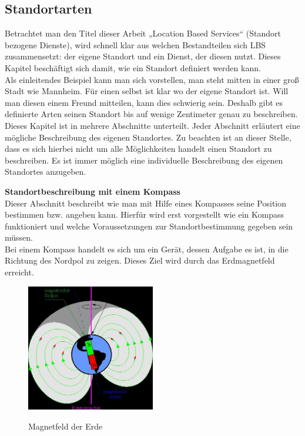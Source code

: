 \subsection{Standortarten}
Betrachtet man den Titel dieser Arbeit „Location Based Services“ (Standort bezogene Dienste), wird schnell klar aus welchen Bestandteilen sich LBS zusammensetzt: der eigene Standort und ein Dienst, der diesen nutzt. Dieses Kapitel beschäftigt sich damit, wie ein Standort definiert werden kann.
\\Als einleitendes Beispiel kann man sich vorstellen, man steht mitten in einer groß Stadt wie Mannheim. Für einen selbst ist klar wo der eigene Standort ist. Will man diesen einem Freund mitteilen, kann dies schwierig sein. Deshalb gibt es definierte Arten seinen Standort bis auf wenige Zentimeter genau zu beschreiben. Dieses Kapitel ist in mehrere Abschnitte unterteilt. Jeder Abschnitt erläutert eine mögliche Beschreibung des eigenen Standortes.
Zu beachten ist an dieser Stelle, dass es sich hierbei nicht um alle Möglichkeiten handelt einen Standort zu beschreiben. Es ist immer möglich eine individuelle Beschreibung des eigenen Standortes anzugeben. 

\textbf{Standortbeschreibung mit einem Kompass}
\\Dieser Abschnitt beschreibt wie man mit Hilfe eines Kompasses seine Position bestimmen bzw. angeben kann. Hierfür wird erst vorgestellt wie ein Kompass funktioniert und welche Voraussetzungen zur Standortbestimmung gegeben sein müssen.
\\Bei einem Kompass handelt es sich um ein Gerät, dessen Aufgabe es ist, in die Richtung des Nordpol zu zeigen. Dieses Ziel wird durch das Erdmagnetfeld erreicht.


\begin{figure}
  \centering
    \includegraphics[width=0.50\textwidth]{ref/images/magnetfeld.jpg}
   \caption{Magnetfeld der Erde}
  \label{fig:Magnetfeld}
  \cite{Magnetfeld}
\end{figure}




